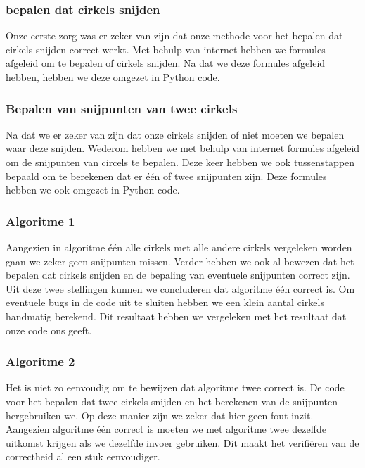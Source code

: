 \documentclass[11pt,a4paper]{article}
\begin{document}
\subsubsection*{bepalen dat cirkels snijden}
Onze eerste zorg was er zeker van zijn dat onze methode voor het bepalen dat cirkels snijden correct werkt. Met behulp van internet hebben we formules afgeleid om te bepalen of cirkels snijden. Na dat we deze formules afgeleid hebben, hebben we deze omgezet in Python code.

\subsubsection*{Bepalen van snijpunten van twee cirkels}
Na dat we er zeker van zijn dat onze cirkels snijden of niet moeten we bepalen waar deze snijden. Wederom hebben we met behulp van internet formules afgeleid om de snijpunten van circels te bepalen. Deze keer hebben we ook tussenstappen bepaald om te berekenen dat er \'e\'en of twee snijpunten zijn. Deze formules hebben we ook omgezet in Python code.

\subsubsection*{Algoritme 1}

Aangezien in algoritme \'e\'en alle cirkels met alle andere cirkels vergeleken worden gaan we zeker geen snijpunten missen. Verder hebben we ook al bewezen dat het bepalen dat cirkels snijden en de bepaling van eventuele snijpunten correct zijn. Uit deze twee stellingen kunnen we concluderen dat algoritme \'e\'en correct is.
Om eventuele bugs in de code uit te sluiten hebben we een klein aantal cirkels handmatig berekend. Dit resultaat hebben we vergeleken met het resultaat dat onze code ons geeft.

\subsubsection*{Algoritme 2}


Het is niet zo eenvoudig om te bewijzen dat algoritme twee correct is. De code voor het bepalen dat twee cirkels snijden en het berekenen van de snijpunten hergebruiken we. Op deze manier zijn we zeker dat hier geen fout inzit.
Aangezien algoritme \'e\'en correct is moeten we met algoritme twee dezelfde uitkomst krijgen als we dezelfde invoer gebruiken. Dit maakt het verifi\"eren van de correctheid al een stuk eenvoudiger.
\end{document}
